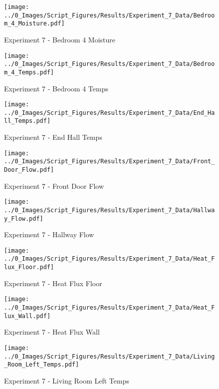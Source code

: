 	\clearpage

	\begin{figure}[H]
		\centering
		\texttt{[image: ../0\_Images/Script\_Figures/Results/Experiment\_7\_Data/Bedroom\_4\_Moisture.pdf]}
		\caption[]{Experiment 7 - Bedroom 4 Moisture}
	\end{figure}
 

	\begin{figure}[H]
		\centering
		\texttt{[image: ../0\_Images/Script\_Figures/Results/Experiment\_7\_Data/Bedroom\_4\_Temps.pdf]}
		\caption[]{Experiment 7 - Bedroom 4 Temps}
	\end{figure}
 
	\clearpage

	\begin{figure}[H]
		\centering
		\texttt{[image: ../0\_Images/Script\_Figures/Results/Experiment\_7\_Data/End\_Hall\_Temps.pdf]}
		\caption[]{Experiment 7 - End Hall Temps}
	\end{figure}
 

	\begin{figure}[H]
		\centering
		\texttt{[image: ../0\_Images/Script\_Figures/Results/Experiment\_7\_Data/Front\_Door\_Flow.pdf]}
		\caption[]{Experiment 7 - Front Door Flow}
	\end{figure}
 
	\clearpage

	\begin{figure}[H]
		\centering
		\texttt{[image: ../0\_Images/Script\_Figures/Results/Experiment\_7\_Data/Hallway\_Flow.pdf]}
		\caption[]{Experiment 7 - Hallway Flow}
	\end{figure}
 

	\begin{figure}[H]
		\centering
		\texttt{[image: ../0\_Images/Script\_Figures/Results/Experiment\_7\_Data/Heat\_Flux\_Floor.pdf]}
		\caption[]{Experiment 7 - Heat Flux Floor}
	\end{figure}
 
	\clearpage

	\begin{figure}[H]
		\centering
		\texttt{[image: ../0\_Images/Script\_Figures/Results/Experiment\_7\_Data/Heat\_Flux\_Wall.pdf]}
		\caption[]{Experiment 7 - Heat Flux Wall}
	\end{figure}
 

	\begin{figure}[H]
		\centering
		\texttt{[image: ../0\_Images/Script\_Figures/Results/Experiment\_7\_Data/Living\_Room\_Left\_Temps.pdf]}
		\caption[]{Experiment 7 - Living Room Left Temps}
	\end{figure}
 
